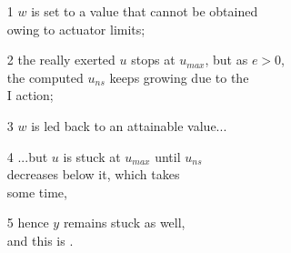 \begin{frame}
\myPause
 \begin{columns}
  \myPause
   \begin{itemize}[<+-| alert@+>]
   \item[1] $w$ is set to a value that cannot be obtained\\
            owing to actuator limits;
   \item[2] the really exerted $u$ stops at $u_{max}$, but as $e>0$,\\
            the computed $u_{ns}$ keeps growing due to the\\
            I action;
   \item[3] $w$ is led back to an attainable value...
   \item[4] ...but $u$ is stuck at $u_{max}$ until $u_{ns}$\\
            decreases below it, which takes\\
            some time,
   \item[5] hence $y$ remains stuck as well,\\
            and this is .
   \end{itemize}
 \end{columns}
\end{frame}

